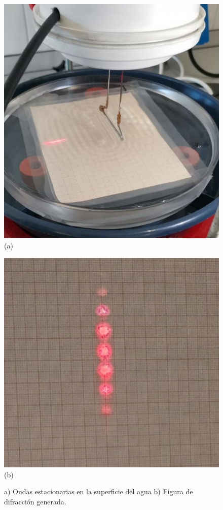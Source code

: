 \begin{figure}[H]
	\centering
	\begin{minipage}{0.40\textwidth} 
		\includegraphics[width=\textwidth]{grafico_02x02_ondas_stacionarias.png}
		\centering(a)
	\end{minipage}
	\hspace{0.5cm}
	\begin{minipage}{0.45\textwidth} 
		\includegraphics[width=1\textwidth]{grafico_02x03_figura_difraccion.png}
		\centering (b)
	\end{minipage}
	\caption{ \footnotesize {a) Ondas estacionarias en la superficie del agua b) Figura de difracción generada.}}
	\label{fig:estdif}
\end{figure}

